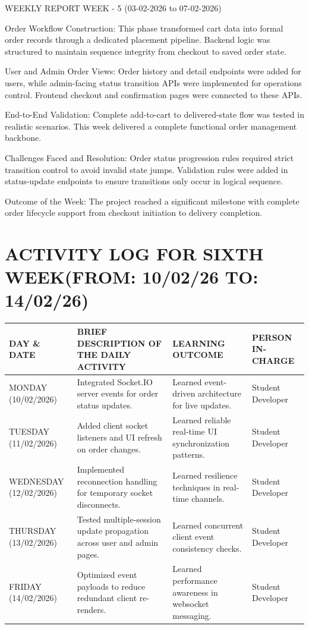 \documentclass[12pt,a4paper]{report}
\begin{document}
WEEKLY REPORT
WEEK - 5 (03-02-2026 to 07-02-2026)

Order Workflow Construction:
This phase transformed cart data into formal order records through a dedicated placement pipeline. Backend logic was structured to maintain sequence integrity from checkout to saved order state.

User and Admin Order Views:
Order history and detail endpoints were added for users, while admin-facing status transition APIs were implemented for operations control. Frontend checkout and confirmation pages were connected to these APIs.

End-to-End Validation:
Complete add-to-cart to delivered-state flow was tested in realistic scenarios. This week delivered a complete functional order management backbone.

Challenges Faced and Resolution:
Order status progression rules required strict transition control to avoid invalid state jumps. Validation rules were added in status-update endpoints to ensure transitions only occur in logical sequence.

Outcome of the Week:
The project reached a significant milestone with complete order lifecycle support from checkout initiation to delivery completion.

\section*{ACTIVITY LOG FOR SIXTH WEEK(FROM: 10/02/26 TO: 14/02/26)}
\begin{longtable}{|p{2.2cm}|p{5.2cm}|p{4.3cm}|p{3.2cm}|}
\hline
\textbf{DAY \& DATE} & \textbf{BRIEF DESCRIPTION OF THE DAILY ACTIVITY} & \textbf{LEARNING OUTCOME} & \textbf{PERSON IN- CHARGE} \\
\hline
MONDAY (10/02/2026) & Integrated Socket.IO server events for order status updates. & Learned event-driven architecture for live updates. & Student Developer \\
\hline
TUESDAY (11/02/2026) & Added client socket listeners and UI refresh on order changes. & Learned reliable real-time UI synchronization patterns. & Student Developer \\
\hline
WEDNESDAY (12/02/2026) & Implemented reconnection handling for temporary socket disconnects. & Learned resilience techniques in real-time channels. & Student Developer \\
\hline
THURSDAY (13/02/2026) & Tested multiple-session update propagation across user and admin pages. & Learned concurrent client event consistency checks. & Student Developer \\
\hline
FRIDAY (14/02/2026) & Optimized event payloads to reduce redundant client re-renders. & Learned performance awareness in websocket messaging. & Student Developer \\
\hline
\end{longtable}
\end{document}
